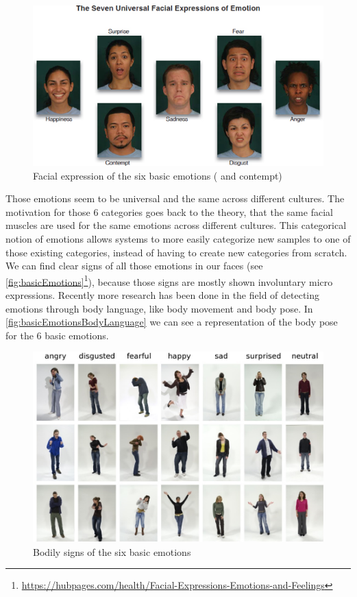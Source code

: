 \documentclass[conference]{IEEEtran}
\begin{document}
\begin{figure}
\centering
   \includegraphics[width=\linewidth]{basicEmotions.jpg}
   \caption{Facial expression of the six basic emotions ( and contempt)}
  \label{fig:basicEmotions}
\end{figure}

Those emotions seem to be universal and the same across different cultures\cite{ekmann1973universal}. The motivation for those 6 categories goes back to the theory, that the same facial muscles are used for the same emotions across different cultures\cite{schindler2008recognizing}. This categorical notion of emotions allows systems to more easily categorize new samples to one of those existing categories, instead of having to create new categories from scratch\cite{schindler2008recognizing}.
We can find clear signs of all those emotions in our faces (see \autoref{fig:basicEmotions}\footnote{\url{https://hubpages.com/health/Facial-Expressions-Emotions-and-Feelings}}), because those signs are mostly shown involuntary micro expressions. Recently more research has been done in the field of detecting emotions through body language, like body movement and body pose\cite{de2006towards,grezes2007perceiving,meeren2005rapid}. In \autoref{fig:basicEmotionsBodyLanguage} we can see a representation of the body pose for the 6 basic emotions. 
\begin{figure}
\centering
   \includegraphics[width=\linewidth]{basicEmotionsBodylanguage.jpg}
  \caption{Bodily signs of the six basic emotions\cite{schindler2008recognizing}}
  \label{fig:basicEmotionsBodyLanguage}
\end{figure}
\end{document}
